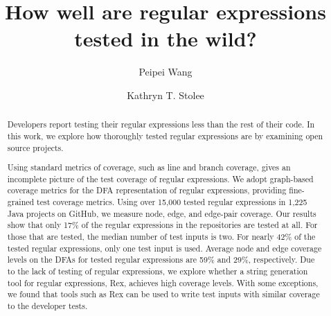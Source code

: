 \documentclass[sigconf,screen]{acmart}
\begin{document}
\title[Testing Regular Expressions]{How well are regular expressions tested in the wild?}


\iftrue
\author{Peipei Wang}

\author{Kathryn T. Stolee}

\fi



\begin{abstract}
Developers report testing their regular expressions less than the rest of their code. In this work, we explore how thoroughly tested regular expressions are by examining open source projects. 

Using standard metrics of coverage, such as line and branch coverage, gives an incomplete picture of the test coverage of regular expressions. We adopt graph-based coverage metrics for the DFA representation of regular expressions, providing fine-grained test coverage metrics. Using over 15,000 tested regular expressions in 1,225 Java projects on GitHub, we measure node, edge, and edge-pair coverage. Our results show that only 17\% of the regular expressions in the repositories are tested at all. For those that are tested,  the median number of test inputs is two. For nearly 42\%  of the tested regular expressions, only one test input is used. Average node and edge coverage levels on the DFAs for tested regular expressions are 59\% and 29\%, respectively. Due to the lack of testing of regular expressions, we explore whether a string generation tool for regular expressions, Rex, achieves high coverage levels. With some exceptions, we found that tools such as Rex can be used to write test inputs with similar coverage to the developer tests. 
\end{abstract}
\end{document}
